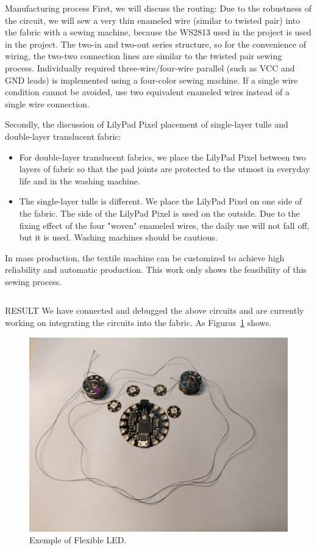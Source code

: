 \documentclass[final]{beamer}
\begin{document}
\begin{frame}[t, fragile = singleslide]{}
\begin{columns}[t]
\begin{column}{0.45\textwidth}
\begin{block}{Manufacturing process}
First, we will discuss the routing: Due to the robustness of the circuit, we will sew a very thin enameled wire (similar to twisted pair) into the fabric with a sewing machine, because the WS2813 used in the project is used in the project. The two-in and two-out series structure, so for the convenience of wiring, the two-two connection lines are similar to the twisted pair sewing process. Individually required three-wire/four-wire parallel (such as VCC and GND leads) is implemented using a four-color sewing machine. If a single wire condition cannot be avoided, use two equivalent enameled wires instead of a single wire connection.

Secondly, the discussion of LilyPad Pixel placement of single-layer tulle and double-layer translucent fabric:


\begin{itemize}
\item For double-layer translucent fabrics, we place the LilyPad Pixel between two layers of fabric so that the pad joints are protected to the utmost in everyday life and in the washing machine.

\item The single-layer tulle is different. We place the LilyPad Pixel on one side of the fabric. The side of the LilyPad Pixel is used on the outside. Due to the fixing effect of the four "woven" enameled wires, the daily use will not fall off, but it is used. Washing machines should be cautious.
\end{itemize}

In mass production, the textile machine can be customized to achieve high reliability and automatic production. This work only shows the feasibility of this sewing process.
\end{block}

\end{column}

\end{columns}

\begin{columns}[t]

\begin{column}{0.945\textwidth}

\begin{block}{RESULT}
We have connected and debugged the above circuits and are currently working on integrating the circuits into the fabric. As Figuras~\ref{fig:graficoxy1} shows.

\begin{figure}[!htb]
\centering
\caption{Exemple of Flexible LED.}
\label{fig:graficoxy1}
\includegraphics[width = 0.25\columnwidth]{./Figuras/LED.jpg}
\end{figure}


\end{block}
\end{column}
\end{columns}
\end{frame}
\end{document}
